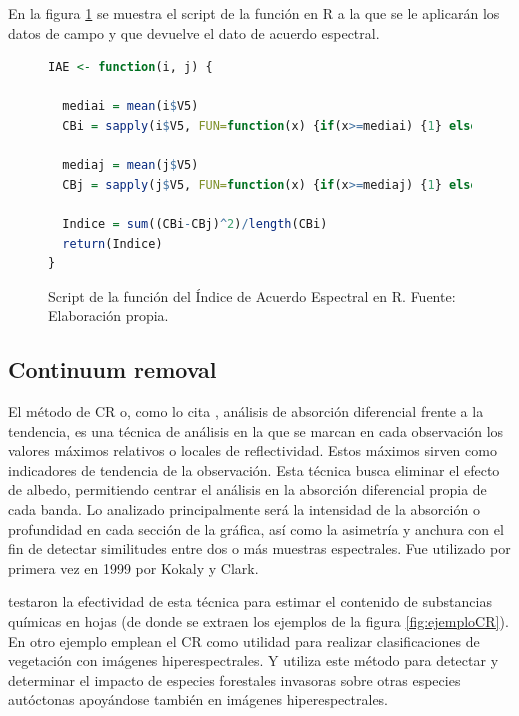 En la figura \ref{fig:IAE} se muestra el script de la función en R a la que se le aplicarán los datos de campo y que devuelve el dato de acuerdo espectral.

\begin{figure}
\centering
\begin{lstlisting}[language = R, frame = single]
  IAE <- function(i, j) {
  
  mediai = mean(i$V5)
  CBi = sapply(i$V5, FUN=function(x) {if(x>=mediai) {1} else {0}})
  
  mediaj = mean(j$V5)
  CBj = sapply(j$V5, FUN=function(x) {if(x>=mediaj) {1} else {0}})
  	
  Indice = sum((CBi-CBj)^2)/length(CBi)
  return(Indice)  
}
\end{lstlisting}
\caption[Función de Índice de Acuerdo Espectral]{Script de la función del Índice de Acuerdo Espectral en R. Fuente: Elaboración propia.}
\label{fig:IAE}
\end{figure}

\subsection{Continuum removal}
\label{subsec:Continuum_removal}

El método de \ac{CR} o, como lo cita \cite{chuvieco2002teledeteccion}, análisis de absorción diferencial frente a la tendencia, es una técnica de análisis en la que se marcan en cada observación los valores máximos relativos o locales de reflectividad. Estos máximos sirven como indicadores de tendencia de la observación. Esta técnica busca eliminar el efecto de albedo, permitiendo centrar el análisis en la absorción diferencial propia de cada banda. Lo analizado principalmente será la intensidad de la absorción o profundidad en cada sección de la gráfica, así como la asimetría y anchura con el fin de detectar similitudes entre dos o más muestras espectrales. Fue utilizado por primera vez en 1999 por Kokaly y Clark.\Sep

\cite{huang2004estimating} testaron la efectividad de esta técnica para estimar el contenido de substancias químicas en hojas (de donde se extraen los ejemplos de la figura \ref{fig:ejemploCR}). En otro ejemplo \cite{filippi2007effect} emplean el \ac{CR} como utilidad para realizar clasificaciones de vegetación con imágenes hiperespectrales. Y \cite{underwood2003mapping} utiliza este método para detectar y determinar el impacto de especies forestales invasoras sobre otras especies autóctonas apoyándose también en imágenes hiperespectrales.

